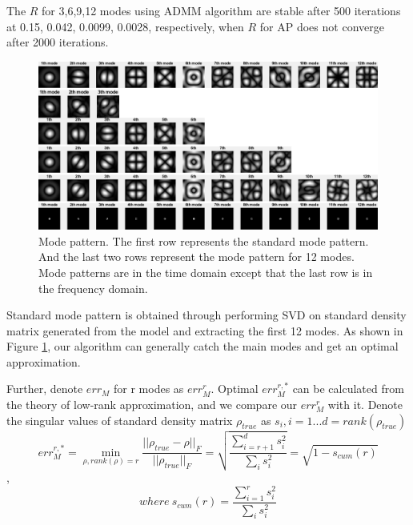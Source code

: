 \documentclass{article}
\numberwithin{equation}{section}
\begin{document}
The $R$ for 3,6,9,12 modes using ADMM algorithm are stable after 500 iterations at 0.15, 0.042, 0.0099, 0.0028, respectively, when $R$ for AP does not converge after 2000 iterations.


\begin{figure}[H]
\centering
\includegraphics[width=1\linewidth]{figures/modes_combine}
\caption{Mode pattern. The first row represents the standard mode pattern. And the last two rows represent the mode pattern for 12 modes. Mode patterns are in the time domain except that the last row is in the frequency domain.}
\label{fig:modescombine}
\end{figure}

Standard mode pattern is obtained through performing SVD on standard density matrix generated from the model and extracting the first 12 modes. As shown in Figure \ref{fig:modescombine}, our algorithm can generally catch the main modes and get an optimal approximation.

Further, denote $err_M$ for r modes as $err_M^r$. Optimal $err_M^{r,*}$ can be calculated from the theory of low-rank approximation, and we compare our $err_M^r$ with it. Denote the singular values of standard density matrix $\rho_{true}$ as $s_i,i=1...d=rank(\rho_{true})$
 $$
 err_M^{r,*} = \min_{\rho, rank(\rho)=r} \dfrac{||\rho_{true} - \rho||_F}{||\rho_{true}||_F} = \sqrt{\dfrac{\sum_{i=r+1}^{d}s_i^2}{\sum_i s_i^2}}
 =
 \sqrt{1 - s_{cum}(r)}
 $$,
 $$
 where\ 
 s_{cum}(r) = \dfrac{\sum_{i=1}^{r}s_i^2}{\sum_i s_i^2} 
 $$
 
\end{document}
